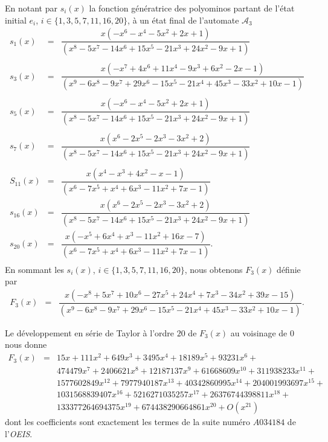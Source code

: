 En notant par $s_{i}(x)$ la fonction génératrice des polyominos partant de l'état initial $e_{i}$, $i\in \{1, 3, 5, 7, 11, 16, 20\}$, à un état final de l'automate $\mathcal{A}_{3}$ 
\begin{eqnarray*}
s_1(x) &=& \dfrac{x(-x^{6} - x^{4} - 5x^{2} + 2x + 1)}{(x^{8} - 5x^{7} - 14x^{6} + 15x^{5} - 21x^{3} + 24x^{2} - 9x + 1)}\\
& &\\
s_3(x) &=& \dfrac{x(-x^{7} + 4x^{6} + 11x^{4} - 9x^{3} + 6x^{2} - 2x - 1)}{(x^{9} - 6x^{8} - 9x^{7} + 29x^{6} - 15x^{5} - 21x^{4} + 45x^{3} - 33x^{2} + 10x - 1)} \\
& &\\
s_5(x) &=& \dfrac{ x(-x^{6} - x^{4} - 5x^{2} + 2x + 1)}{(x^{8} - 5x^{7} - 14x^{6} + 15x^{5} - 21x^{3} + 24x^{2} - 9x + 1)}\\
& &\\
s_7(x) &=& \dfrac{x(x^{6} - 2x^{5} - 2x^{3} - 3x^{2} + 2)}{(x^{8} - 5x^{7} - 14x^{6} + 15x^{5} - 21x^{3} + 24x^{2} - 9x + 1)}\\
& &\\
S_{11}(x) &=& \dfrac{x(x^{4} - x^{3} + 4x^{2} - x - 1)}{(x^{6} - 7x^{5} + x^{4} + 6x^{3} - 11x^{2} + 7x - 1)}\\
s_{16}(x) &=& \dfrac{ x(x^{6} - 2x^{5} - 2x^{3} - 3x^{2} + 2)}{(x^{8} - 5x^{7} - 14x^{6} + 15x^{5} - 21x^{3} + 24x^{2} - 9x + 1)}\\
s_{20}(x) &=& \dfrac{x(-x^{5} + 6x^{4} + x^{3} - 11x^{2} + 16x - 7)}{(x^{6} - 7x^{5} + x^{4} + 6x^{3} - 11x^{2} + 7x - 1)}.\\
\end{eqnarray*}
En sommant les $s_{i}(x)$,  $i\in \{1, 3, 5, 7, 11, 16, 20\}$, nous obtenons $F_{3}(x)$ définie par
\begin{eqnarray*}
F_3(x) &=&\dfrac{x(-x^{8} + 5x^{7} + 10x^{6} - 27x^{5} + 24x^{4} + 7x^{3} - 34x^{2} + 39x - 15)}{(x^{9} - 6x^{8} - 9x^{7} + 29x^{6} - 15x^{5} - 21x^{4} + 45x^{3} - 33x^{2} + 10x - 1)}.
\end{eqnarray*}
 
Le développement en série de Taylor à l'ordre $20$ de $F_{3}(x)$ au voisinage de $0$ nous donne
\begin{eqnarray*}
F_{3}(x) &=&15x+111x^{2}+649x^{3}+3495x^{4}+18189x^{5}+93231x^{6}+\\
& & 474479x^{7}+2406621x^{8}+12187137x^{9}+61668609x^{10}+311938233x^{11}+\\
& & 1577602849x^{12}+7977940187x^{13}+40342860995x^{14}+204001993697x^{15}+\\
& & 1031568839407x^{16}+5216271035257x^{17}+26376744398811x^{18}+\\
& & 133377264694375x^{19}+674438290664861x^{20}+O(x^{21})
\end{eqnarray*}
dont les coefficients sont exactement les termes de la suite numéro  $A034184$  de l'\emph{OEIS}.



